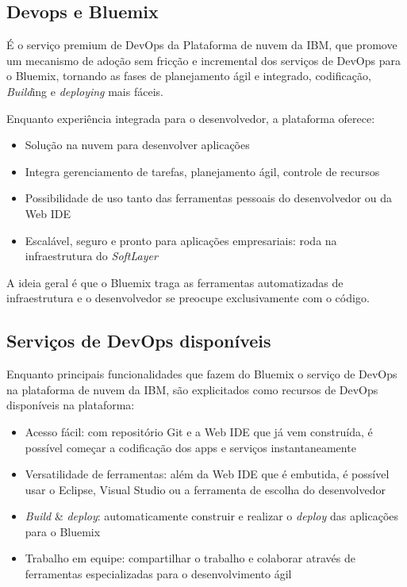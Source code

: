 \subsection{Devops e Bluemix}
É o serviço premium de DevOps da Plataforma de nuvem da IBM, que promove um mecanismo de adoção sem fricção e incremental dos serviços de DevOps para o Bluemix, tornando as fases de planejamento ágil e integrado, codificação, \textit{Build}ing e \textit{deploying} mais fáceis.

Enquanto experiência integrada para o desenvolvedor, a plataforma oferece:
\begin{itemize}
    \item Solução na nuvem para desenvolver aplicações
    \item Integra gerenciamento de tarefas, planejamento ágil, controle de recursos
    \item Possibilidade de uso tanto das ferramentas pessoais do desenvolvedor ou da Web IDE
    \item Escalável, seguro e pronto para aplicações empresariais: roda na infraestrutura do \textit{SoftLayer}
\end{itemize}

A ideia geral é que o Bluemix traga as ferramentas automatizadas de infraestrutura e o desenvolvedor se preocupe exclusivamente com o código.

\subsection{Serviços de DevOps disponíveis}

Enquanto principais funcionalidades que fazem do Bluemix o serviço de DevOps na plataforma de nuvem da IBM, são explicitados como recursos de DevOps disponíveis na plataforma:
\begin{itemize}
    \item Acesso fácil: com repositório Git e a Web IDE que já vem construída, é possível começar a codificação dos apps e serviços instantaneamente
    \item Versatilidade de ferramentas: além da Web IDE que é embutida, é possível usar o Eclipse, Visual Studio ou a ferramenta de escolha do desenvolvedor
    \item \textit{Build} & \textit{deploy}: automaticamente construir e realizar o \textit{deploy} das aplicações para o Bluemix
    \item Trabalho em equipe: compartilhar o trabalho e colaborar através de ferramentas especializadas para o desenvolvimento ágil
\end{itemize}

